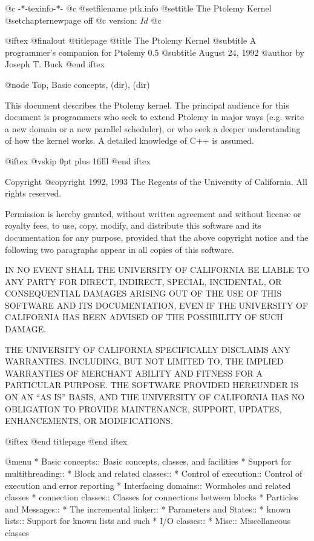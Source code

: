      @c -*-texinfo-*-
@c %
@setfilename ptk.info
@settitle The Ptolemy Kernel
@setchapternewpage off
@c version: $Id$
@c %

@iftex
@finalout
@titlepage
@title The Ptolemy Kernel
@subtitle A programmer's companion for Ptolemy 0.5
@subtitle August 24, 1992
@author by Joseph T. Buck
@end iftex

@node Top, Basic concepts, (dir), (dir)

This document describes the Ptolemy kernel.  The principal audience for
this document is programmers who seek to extend Ptolemy in major ways
(e.g. write a new domain or a new parallel scheduler), or who seek a
deeper understanding of how the kernel works.  A detailed knowledge of
C++ is assumed.

@iftex
@vskip 0pt plus 1filll
@end iftex

Copyright @copyright{} 1992, 1993 The Regents of the University of
California.  All rights reserved.

Permission is hereby granted, without written agreement and without
license or royalty fees, to use, copy, modify, and distribute this
software and its documentation for any purpose, provided that the above
copyright notice and the following two paragraphs appear in all copies of
this software.

IN NO EVENT SHALL THE UNIVERSITY OF CALIFORNIA BE LIABLE TO ANY PARTY FOR
DIRECT, INDIRECT, SPECIAL, INCIDENTAL, OR CONSEQUENTIAL DAMAGES ARISING
OUT OF THE USE OF THIS SOFTWARE AND ITS DOCUMENTATION, EVEN IF THE
UNIVERSITY OF CALIFORNIA HAS BEEN ADVISED OF THE POSSIBILITY OF SUCH
DAMAGE.

THE UNIVERSITY OF CALIFORNIA SPECIFICALLY DISCLAIMS ANY WARRANTIES,
INCLUDING, BUT NOT LIMITED TO, THE IMPLIED WARRANTIES OF MERCHANT ABILITY
AND FITNESS FOR A PARTICULAR PURPOSE. THE SOFTWARE PROVIDED HEREUNDER IS
ON AN ``AS IS'' BASIS, AND THE UNIVERSITY OF CALIFORNIA HAS NO OBLIGATION
TO PROVIDE MAINTENANCE, SUPPORT, UPDATES, ENHANCEMENTS, OR MODIFICATIONS.

@iftex
@end titlepage
@end iftex

@menu
* Basic concepts::  Basic concepts, classes, and facilities
* Support for multithreading::  
* Block and related classes::  
* Control of execution::  Control of execution and error reporting
* Interfacing domains::  Wormholes and related classes
* connection classes::  Classes for connections between blocks
* Particles and Messages::  
* The incremental linker::  
* Parameters and States::  
* known lists::     Support for known lists and such
* I/O classes::     
* Misc::            Miscellaneous classes

